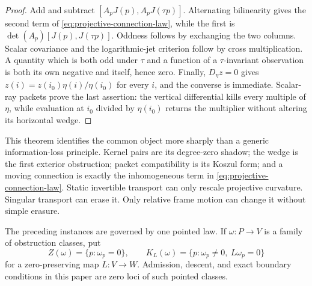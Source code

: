 \documentclass[11pt]{article}
\theoremstyle{definition}
\theoremstyle{remark}
\begin{document}
\begin{proof}
Add and subtract \([A_pJ(p),A_pJ(\tau p)]\).  Alternating
bilinearity gives the second term of
\eqref{eq:projective-connection-law}, while the first is
\(\det(A_p)[J(p),J(\tau p)]\).  Oddness follows by exchanging the two
columns.  Scalar covariance and the logarithmic-jet criterion follow by
cross multiplication.  A quantity which is both odd under \(\tau\) and a
function of a \(\tau\)-invariant observation is both its own negative and
itself, hence zero.  Finally, \(D_\eta z=0\) gives
\(z(i)=z(i_0)\eta(i)/\eta(i_0)\) for every \(i\), and the converse is
immediate.  Scalar-ray packets prove the last assertion: the vertical
differential kills every multiple of \(\eta\), while evaluation at \(i_0\)
divided by \(\eta(i_0)\) returns the multiplier without altering its
horizontal wedge.
\end{proof}

This theorem identifies the common object more sharply than a generic
information-loss principle.  Kernel pairs are its degree-zero shadow;
the wedge is the first exterior obstruction; packet compatibility is its
Koszul form; and a moving connection is exactly the inhomogeneous term in
\eqref{eq:projective-connection-law}.  Static invertible transport can only
rescale projective curvature.  Singular transport can erase it.  Only
relative frame motion can change it without simple erasure.

The preceding instances are governed by one pointed law.  If
\(\omega:P\to V\) is a family of obstruction classes, put
\[
 Z(\omega)=\{p:\omega_p=0\},\qquad
 K_L(\omega)=\{p:\omega_p\ne0,\ L\omega_p=0\}
\]
for a zero-preserving map \(L:V\to W\).  Admission, descent, and exact
boundary conditions in this paper are zero loci of such pointed classes.
\end{document}

